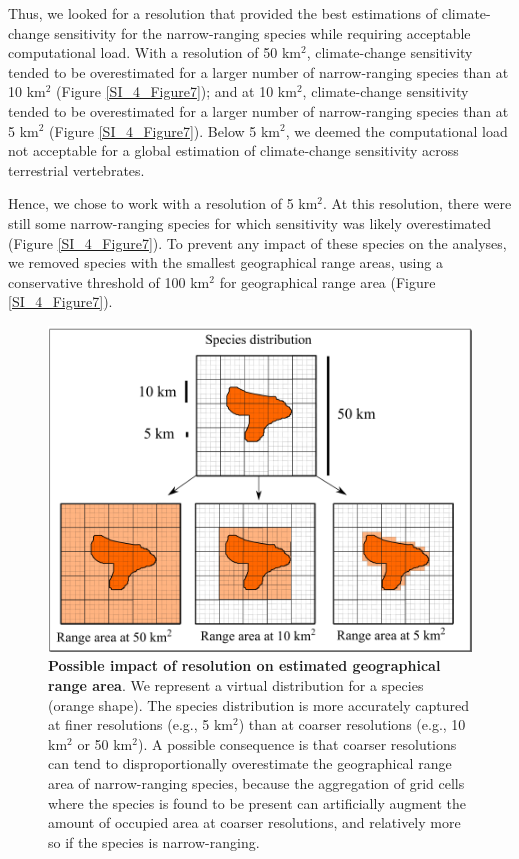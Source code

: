\documentclass[11pt]{article}
\begin{document}
Thus, we looked for a resolution that provided the best estimations of climate-change sensitivity for the narrow-ranging species while requiring acceptable computational load. With a resolution of 50 km$^2$, climate-change sensitivity tended to be overestimated for a larger number of narrow-ranging species than at 10 km$^2$ (Figure \ref{SI_4_Figure7}); and at 10 km$^2$, climate-change sensitivity tended to be overestimated for a larger number of narrow-ranging species than at 5 km$^2$ (Figure \ref{SI_4_Figure7}). Below 5 km$^2$, we deemed the computational load not acceptable for a global estimation of climate-change sensitivity across terrestrial vertebrates.

Hence, we chose to work with a resolution of 5 km$^2$. At this resolution, there were still some narrow-ranging species for which sensitivity was likely overestimated (Figure \ref{SI_4_Figure7}). To prevent any impact of these species on the analyses, we removed species with the smallest geographical range areas, using a conservative threshold of 100 km$^2$ for geographical range area (Figure \ref{SI_4_Figure7}).

\vspace{0.5cm}
\begin{figure}[h!]
\centering
\includegraphics[scale=0.6]{Figures/ResolutionConcept.png}
\caption[Possible impact of resolution on estimated geographical range area]{\textbf{Possible impact of resolution on estimated geographical range area}. We represent a virtual distribution for a species (orange shape). The species distribution is more accurately captured at finer resolutions (e.g., 5 km$^2$) than at coarser resolutions (e.g., 10 km$^2$ or 50 km$^2$). A possible consequence is that coarser resolutions can tend to disproportionally overestimate the geographical range area of narrow-ranging species, because the aggregation of grid cells where the species is found to be present can artificially augment the amount of occupied area at coarser resolutions, and relatively more so if the species is narrow-ranging.}
\label{SI_4_Figure6}
\end{figure}
  
\end{document}
